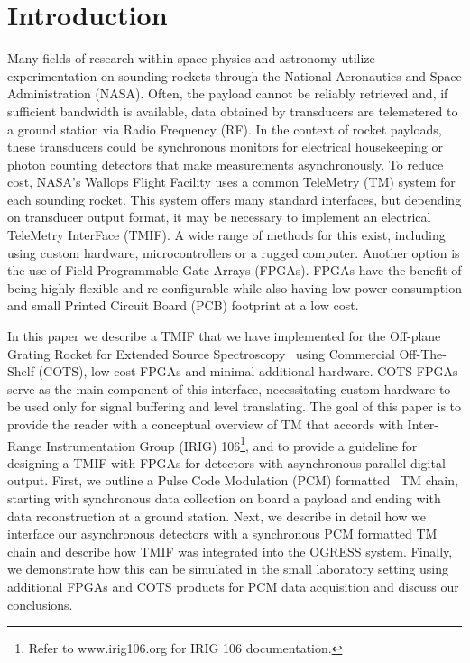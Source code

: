 \documentclass{ws-jai}
\begin{document}

\section{Introduction}
\label{sect:intro}
Many fields of research within space physics and astronomy utilize experimentation on sounding rockets through the National Aeronautics and Space Administration (NASA). Often, the payload cannot be reliably retrieved and, if sufficient bandwidth is available, data obtained by transducers are telemetered to a ground station via Radio Frequency (RF). In the context of rocket payloads, these transducers could be synchronous monitors for electrical housekeeping or photon counting detectors that make measurements asynchronously. To reduce cost, NASA's Wallops Flight Facility uses a common TeleMetry (TM) system for each sounding rocket. This system offers many standard interfaces, but depending on transducer output format, it may be necessary to implement an electrical TeleMetry InterFace (TMIF). A wide range of methods for this exist, including using custom hardware, microcontrollers or a rugged computer. Another option is the use of Field-Programmable Gate Arrays (FPGAs). FPGAs have the benefit of being highly flexible and re-configurable while also having low power consumption and small Printed Circuit Board (PCB) footprint at a low cost. 

In this paper we describe a TMIF that we have implemented for the Off-plane Grating Rocket for Extended Source Spectroscopy~\cite[OGRESS;][]{Rogers13} using Commercial Off-The-Shelf (COTS), low cost FPGAs and minimal additional hardware. COTS FPGAs serve as the main component of this interface, necessitating custom hardware to be used only for signal buffering and level translating.
The goal of this paper is to provide the reader with a conceptual overview of TM that accords with Inter-Range Instrumentation Group (IRIG) 106\footnote{Refer to www.irig106.org for IRIG 106 documentation.}, and to provide a guideline for designing a TMIF with FPGAs for detectors with asynchronous parallel digital output. First, we outline a Pulse Code Modulation (PCM) formatted~\cite{TMapp06,Plonus01} TM chain, starting with synchronous data collection on board a payload and ending with data reconstruction at a ground station. Next, we describe in detail how we interface our asynchronous detectors with a synchronous PCM formatted TM chain and describe how TMIF was integrated into the OGRESS system. Finally, we demonstrate how this can be simulated in the small laboratory setting using additional FPGAs and COTS products for PCM data acquisition and discuss our conclusions.
\end{document}
